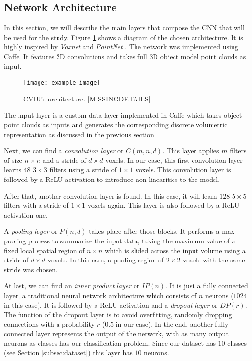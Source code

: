 \subsection{Network Architecture}
\label{cha:objrecog:sec:study:subsec:architecture}

In this section, we will describe the main layers that compose the \ac{CNN} that will be used for the study. Figure \ref{fig:objrecog:cviuarch} shows a diagram of the chosen architecture. It is highly inspired by \emph{Voxnet} \cite{Maturana2015} and \emph{PointNet} \cite{Garcia-Garcia2016}. The network was implemented using Caffe. It features \acs{2D} convolutions and takes full \acs{3D} object model point clouds as input.

\begin{figure}[!b]
  \centering
  \texttt{[image: example-image]}
  \caption{CVIU's architecture. [MISSINGDETAILS]}
  \label{fig:objrecog:cviuarch}
\end{figure}

The input layer is a custom data layer implemented in Caffe which takes object point clouds as inputs and generates the corresponding discrete volumetric representation as discussed in the previous section.

Next, we can find a \emph{convolution layer} or $C(m, n, d)$. This layer applies $m$ filters of size $n\times n$ and a stride of $d\times d$ voxels. In our case, this first convolution layer learns $48$ $3\times3$ filters using a stride of $1\times 1$ voxels. This convolution layer is followed by a \ac{ReLU} activation to introduce non-linearities to the model.

After that, another convolution layer is found. In this case, it will learn $128$ $5\times5$ filters with a stride of $1\times 1$ voxels again. This layer is also followed by a \ac{ReLU} activation one.

A \emph{pooling layer} or $P(n, d)$ takes place after those blocks. It performs a max-pooling process to summarize the input data, taking the maximum value of a fixed local spatial region of $n\times n$ which is slided across the input volume using a stride of $d \times d$ voxels. In this case, a pooling region of $2\times 2$ voxels with the same stride was chosen.

At last, we can find an \emph{inner product layer} or $IP(n)$. It is just a fully connected layer, a traditional neural network architecture which consists of $n$ neurons ($1024$ in this case). It is followed by a \acs{ReLU} activation and a \emph{dropout layer} \cite{Srivastava2014} or $DP(r)$. The function of the dropout layer is to avoid overfitting, randomly dropping connections with a probability $r$ ($0.5$ in our case). In the end, another fully connected layer represents the output of the network, with as many output neurons as classes has our classification problem. Since our dataset has $10$ classes (see Section \ref{subsec:dataset}) this layer has $10$ neurons.

